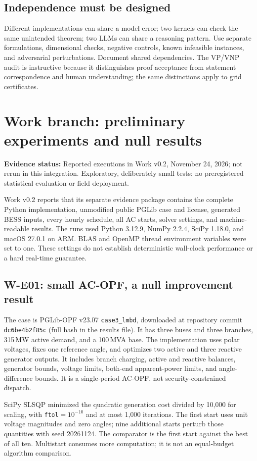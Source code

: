 \documentclass[11pt,letterpaper]{article}
\newcommand{\status}[1]{\textbf{Evidence status:} #1}
\begin{document}
\subsection{Independence must be designed}
Different implementations can share a model error; two kernels can check the same unintended theorem; two LLMs can share a reasoning pattern. Use separate formulations, dimensional checks, negative controls, known infeasible instances, and adversarial perturbations. Document shared dependencies. The VP/VNP audit is instructive because it distinguishes proof acceptance from statement correspondence and human understanding; the same distinctions apply to grid certificates.

\section{Work branch: preliminary experiments and null results}
\label{sec:results}
\status{Reported executions in Work v0.2, November 24, 2026; not rerun in this integration. Exploratory, deliberately small tests; no preregistered statistical evaluation or field deployment.}\cite{workbranch}

Work v0.2 reports that its separate evidence package contains the complete Python implementation, unmodified public PGLib case and license, generated BESS inputs, every hourly schedule, all AC starts, solver settings, and machine-readable results. The runs used Python 3.12.9, NumPy 2.2.4, SciPy 1.18.0, and macOS 27.0.1 on ARM. BLAS and OpenMP thread environment variables were set to one. These settings do not establish deterministic wall-clock performance or a hard real-time guarantee.

\subsection{W-E01: small AC-OPF, a null improvement result}
The case is PGLib-OPF v23.07 \texttt{case3\_lmbd}, downloaded at repository commit
\texttt{dc6be4b2f85c} (full hash in the results file). It has three buses and three branches, 315\,MW active demand, and a 100\,MVA base. The implementation uses polar voltages, fixes one reference angle, and optimizes two active and three reactive generator outputs. It includes branch charging, active and reactive balances, generator bounds, voltage limits, both-end apparent-power limits, and angle-difference bounds. It is a single-period AC-OPF, not security-constrained dispatch.

SciPy SLSQP minimized the quadratic generation cost divided by 10,000 for scaling, with \texttt{ftol}$=10^{-10}$ and at most 1,000 iterations. The first start uses unit voltage magnitudes and zero angles; nine additional starts perturb those quantities with seed 20261124. The comparator is the first start against the best of all ten. Multistart consumes more computation; it is not an equal-budget algorithm comparison.
\end{document}
